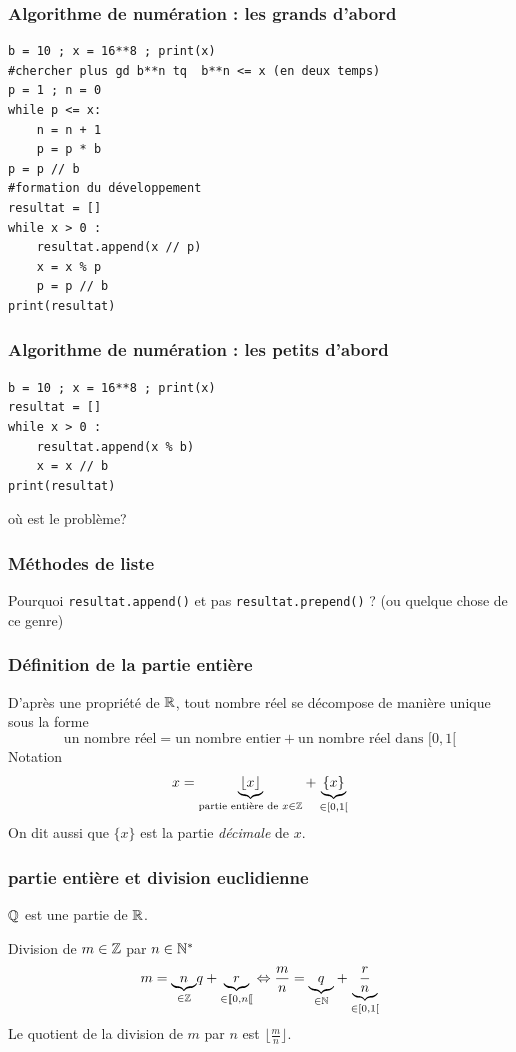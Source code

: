 \begin{frame}[fragile]
  \frametitle{Algorithme de numération : les grands d'abord}
  \begin{verbatim}
b = 10 ; x = 16**8 ; print(x)
#chercher plus gd b**n tq  b**n <= x (en deux temps)
p = 1 ; n = 0
while p <= x:
    n = n + 1
    p = p * b
p = p // b
#formation du développement
resultat = []
while x > 0 :
    resultat.append(x // p)
    x = x % p
    p = p // b
print(resultat)  
\end{verbatim}
\end{frame}

\begin{frame}[fragile]
  \frametitle{Algorithme de numération : les petits d'abord}
  \begin{verbatim}
b = 10 ; x = 16**8 ; print(x)
resultat = []
while x > 0 :
    resultat.append(x % b)
    x = x // b
print(resultat)  
\end{verbatim}
où est le problème?
\end{frame}

\begin{frame}
  \frametitle{Méthodes de liste}
  Pourquoi \newline
  \texttt{resultat.append()}\newline
  et pas\newline
  \texttt{resultat.prepend()} ?
  \newline (ou quelque chose de ce genre)
\end{frame}

\begin{frame}
  \frametitle{Définition de la partie entière}
D'après une propriété de $\mathbb{R}$, tout nombre réel se décompose de manière unique sous la forme
\begin{displaymath}
  \text{un nombre réel} = \text{un nombre entier} + \text{un nombre réel dans $[0,1[$}
\end{displaymath}
Notation
\begin{displaymath}
  x = \underset{\text{partie entière de } x\in \mathbb{Z} }{\underbrace{\lfloor x \rfloor}} + \underset{\in [0,1[ }{\underbrace{\{ x \}}}
\end{displaymath}
On dit aussi que $\{x\}$ est la partie \emph{décimale} de $x$.
\end{frame}

\begin{frame}
\frametitle{partie entière et division euclidienne}
$\mathbb{Q}$ est une partie de $\mathbb{R}$.

Division de $m\in \mathbb{Z}$ par $n\in \mathbb{N}^*$ 
\begin{displaymath}
  m = \underset{\in \mathbb{Z}}{\underbrace{n}}q + \underset{\in \llbracket 0, n\llbracket}{\underbrace{r}}
  \Leftrightarrow \frac{m}{n} = \underset{\in \mathbb{N}}{\underbrace{q}} + \underset{\in [0,1[}{\underbrace{\frac{r}{n}}} 
\end{displaymath}
Le quotient de la division de $m$ par $n$ est $\lfloor \frac{m}{n} \rfloor$.
\end{frame}

